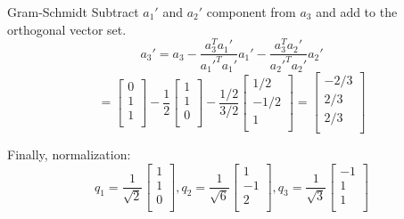 \documentclass{beamer}
\begin{document}
\begin{frame}{Gram-Schmidt}
Subtract $a_1'$ and $a_2'$ component from $a_3$ and add to the orthogonal vector set.
\begin{equation*}
    a_3'=a_3-\frac{a_3^Ta_1'}{a_1'^Ta_1'}a_1'-\frac{a_3^Ta_2'}{a_2'^Ta_2'}a_2'
\end{equation*}
\begin{equation*}
    =\left[ \begin{array}{c}
        0\\
        1\\
        1\\
    \end{array} \right] -\frac{1}{2}\left[ \begin{array}{c}
        1\\
        1\\
        0\\
    \end{array} \right] -\frac{1/2}{3/2}\left[ \begin{array}{c}
        1/2\\
        - 1/2\\
        1\\
    \end{array} \right] =\left[ \begin{array}{c}
        -2/3\\
        2/3\\
        2/3\\
    \end{array} \right]
\end{equation*}

Finally, normalization:
\begin{equation*}
    q_1=\frac{1}{\sqrt{2}}\left[ \begin{array}{c}
        1\\
        1\\
        0\\
    \end{array} \right] , q_2=\frac{1}{\sqrt{6}}\left[ \begin{array}{c}
        1\\
        -1\\
        2\\
    \end{array} \right] , q_3=\frac{1}{\sqrt{3}}\left[ \begin{array}{c}
        -1\\
        1\\
        1\\
    \end{array} \right]
\end{equation*}
\end{frame}
\end{document}
